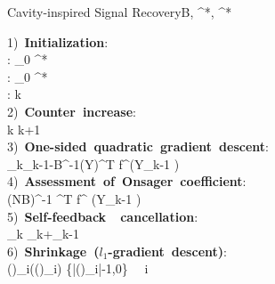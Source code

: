 \documentclass[12pt]{iopart}
\newcommand{\vm}[1]{\boldsymbol{#1}}
\renewcommand{\thepseudocode}{1}
\begin{document}
\begin{figure}
\renewcommand{\thepseudocode}{\arabic{pseudocode}}
\setcounter{pseudocode}{1}
\begin{pseudocode}[ruled]{Cavity-inspired Signal Recovery}{\textsc{B}, ^*, ^*}

1)\ \mbox{\bf Initialization}:\\
 \hspace{15pt}: \hspace{65pt}_{0} \GETS {}^*\\
 \hspace{15pt}: \hspace{65pt} _0 \GETS {}^* \\
\hspace{15pt}: \hspace{62pt} k\\

2)\ \mbox{\bf Counter increase}:\\
 \hspace{30pt}k \GETS k+1\\

3)\ \mbox{\bf One-sided quadratic gradient descent}:\\

 \hspace{30pt}_{k}\GETS  {}_{k-1}-\textsc{B}^{-1}(\textsc{Y}\Phi)^{\rm T} 
 f^\prime\left (\textsc{Y}\Phi {}_{k-1} \right ) \\

4)\ \mbox{\bf Assessment of Onsager coefficient}:\\
 \hspace{30pt}
 \Gamma \GETS (\textsc{NB})^{-1} \vm{1}^{\rm T} f^{\prime\prime} \left (\textsc{Y}\Phi {}_{k-1} \right )\\

5)\ \mbox{\bf{Self-feedback \ cancellation}}:\\
 \hspace{30pt}_k \GETS {}_{k}+\Gamma {}_{k-1}\\

6)\ \mbox{\bf Shrinkage ($l_1$-gradient descent)}:\\ 
 \hspace{30pt}()_i\GETS{}(()_{i})
 \{|()_i|-1,0\} \  \ i\\


\end{pseudocode}
\end{figure}
\end{document}
